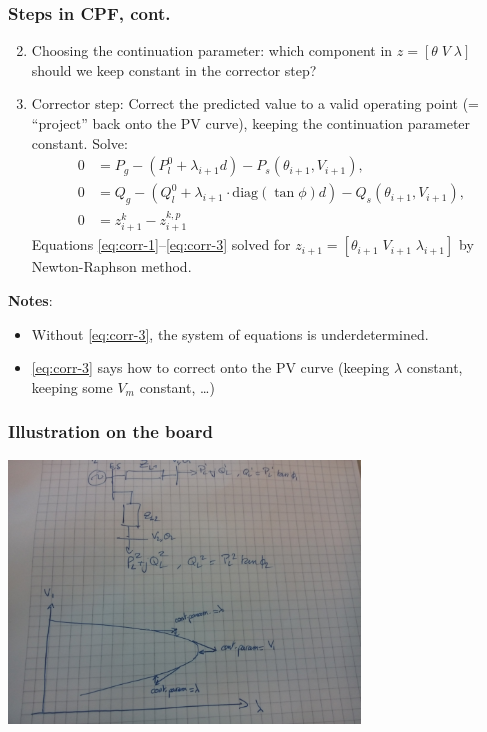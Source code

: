 \documentclass{beamer}
\begin{document}
\begin{frame}
\frametitle{Steps in CPF, cont.}
  \begin{enumerate}
 \setcounter{enumi}{1}
  \item Choosing the continuation parameter: which component in $z = [\theta \; V \; \lambda]$ should we keep constant in the corrector step?
\item Corrector step: Correct the predicted value to a valid operating point (= ``project'' back onto the PV curve), keeping the continuation parameter constant. Solve:
  \begin{align}
      0 &= P_g - (P_l^0 + \lambda_{i+1} d) - P_s(\theta_{i+1},V_{i+1}),\label{eq:corr-1}  \\
      0 &= Q_g - (Q_l^0 + \lambda_{i+1} \cdot \text{diag}(\tan \phi) d)- Q_s(\theta_{i+1},V_{i+1}), \\
      0 &= z_{i+1}^{k}-z_{i+1}^{k,p} \label{eq:corr-3}
  \end{align}
  Equations \eqref{eq:corr-1}--\eqref{eq:corr-3} solved for $z_{i+1} = [\theta_{i+1} \; V_{i+1} \; \lambda_{i+1}]$ by Newton-Raphson method.
  \end{enumerate}
\textbf{Notes}:
\begin{itemize}
\item Without \eqref{eq:corr-3}, the system of equations is underdetermined.
\item \eqref{eq:corr-3} says how to correct onto the PV curve (keeping $\lambda$ constant, keeping some $V_m$ constant, \ldots)
\end{itemize}
\end{frame}

\begin{frame}
  \frametitle{Illustration on the board}
  \includegraphics[width=0.7\textwidth]{Figs/CPF_cont_param.jpg}
\end{frame}
\end{document}
